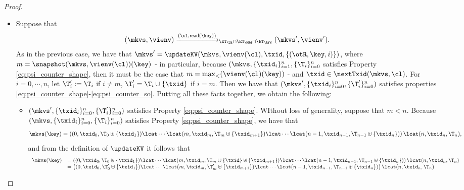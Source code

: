 \begin{proof}
\begin{itemize}
\item Suppose that 
\[
(\mkvs, \vienv) \xrightarrow{(\cl, \mathsf{read}(\key))}_{\ET_{\UA} \cap \ET_{\MRd} \cap \ET_{\RYW}} (\mkvs', \vienv').
\]
As in the previous case, we have that $\mkvs' = \updateKV(\mkvs, \vienv(\cl), \txid, \{(\otR, \key, i)\})$, where 
$m = \snapshot(\mkvs, \vienv(\cl))(\key)$  - 
in particular, because $(\mkvs, \{\txid_{i}\}_{i=1}^{n}, \{\T_{i}\}_{i=0}^{n}$ satisfies 
Property \eqref{eq:psi_counter_shape}, then it must be the case that $m = \max_{<}(\vienv(\cl)(\key))$ - 
and $\txid \in \nextTxid(\mkvs, \cl)$. 
For $i=0,\cdots, n$, let $\T'_{i} := \T_{i}$ if $i \neq m$, $\T'_{i} = \T_{i} \cup \{\txid\}$ if 
$i = m$. Then we have that $(\mkvs', \{\txid_{i}\}_{i=0}^{n}, \{\T'_{i}\}_{i=0}^{n})$ satisfies 
properties \eqref{eq:psi_counter_shape}-\eqref{eq:psi_counter_so}.
Putting all these facts together, we obtain the following: 
\begin{itemize}
\item $(\mkvs', \{\txid_{i}\}_{i=0}^{n}, \{\T'_{i}\}_{i=0}^{n})$ satisfies Property \eqref{eq:psi_counter_shape}. 
WIthout loss of generality, suppose that $m < n$. 
Because $(\mkvs,  \{\txid_{i}\}_{i=0}^{n}, \{\T_{i}\}_{i=0}^{n})$ satisfies Property \eqref{eq:psi_counter_shape}, 
we have that 
\[
\mkvs(\key) = \left( (0, \txid_{0}, \T_{0} \uplus \{\txid_1\}) \lcat \cdots \lcat (m, \txid_{m}, \T_{m} \uplus \{\txid_{m+1}\}) 
\lcat \cdots \lcat (n-1, \txid_{n-1}, \T_{n-1} \uplus \{\txid_{n}\}) \right) \lcat (n, \txid_{n}, \T_{n}),
\] 
and from the definition of $\updateKV$ it follows that 
\[
\begin{array}{ll}
\mkvs(\key) &= \left( (0, \txid_{0}, \T_{0} \uplus \{\txid_1\}) \lcat \cdots \lcat (m, \txid_{m}, \T_{m} \cup \{\txid\} \uplus \{\txid_{m+1}\}) 
\lcat \cdots \lcat (n-1, \txid_{n-1}, \T_{n-1} \uplus \{\txid_{n}\}) \right) \lcat (n, \txid_{n}, \T_{n}) \\
& = \left( (0, \txid_{0}, \T'_{0} \uplus \{\txid_1\}) \lcat \cdots \lcat (m, \txid_{m}, \T'_{m} \uplus \{\txid_{m+1}\}) 
\lcat \cdots \lcat (n-1, \txid_{n-1}, \T_{n-1} \uplus \{\txid_{n}\}) \right) \lcat (n, \txid_{n}, \T_{n})
\end{array}
\]

\end{itemize}
\end{itemize}
\end{proof}
